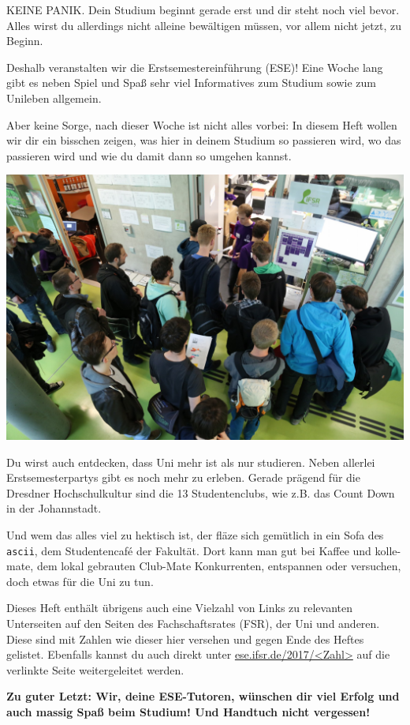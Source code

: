 
KEINE PANIK. 
Dein Studium beginnt gerade erst und dir steht noch viel bevor.
Alles wirst du allerdings nicht alleine bewältigen müssen, vor allem nicht jetzt, zu Beginn.

Deshalb veranstalten wir die Erstsemestereinführung (ESE)!
Eine Woche lang gibt es neben Spiel und Spaß sehr viel Informatives zum Studium sowie zum Unileben allgemein.

Aber keine Sorge, nach dieser Woche ist nicht alles vorbei: In diesem Heft wollen wir dir ein bisschen zeigen, was hier in deinem Studium so passieren wird, wo das passieren wird und wie du damit dann so umgehen kannst.

\begin{minipage}{.65\textwidth}
  \includegraphics[width=\textwidth]{img/ese2015/bueroansturm.jpg}
\end{minipage}%
\hspace*{.4cm}%
\begin{minipage}{.3\textwidth}
  \vspace*{1.5em}
  Du wirst auch entdecken, dass Uni mehr ist als nur studieren.
  Neben allerlei Erstsemesterpartys gibt es noch mehr zu erleben.
  Gerade prägend für die Dresdner Hochschulkultur sind die 13 Studentenclubs, wie z.B. das Count Down in der Johannstadt.\\[0.6em]
\end{minipage}

Und wem das alles viel zu hektisch ist, der fläze sich gemütlich in ein Sofa des \texttt{ascii}, dem Studentencafé der Fakultät. 
Dort kann man gut bei Kaffee und kolle-mate, dem lokal gebrauten Club-Mate Konkurrenten,  entspannen oder versuchen, doch etwas für die Uni zu tun.

Dieses Heft enthält übrigens auch eine Vielzahl von Links zu relevanten Unterseiten auf den Seiten des Fachschaftsrates (FSR), der Uni und anderen.
Diese sind mit Zahlen wie dieser hier  versehen und gegen Ende des Heftes gelistet. Ebenfalls kannst du auch direkt unter \url{ese.ifsr.de/2017/<Zahl>} auf die verlinkte Seite weitergeleitet werden.

\textbf{Zu guter Letzt: Wir, deine ESE-Tutoren, wünschen dir viel Erfolg und auch massig Spaß beim Studium! Und Handtuch nicht vergessen!}
